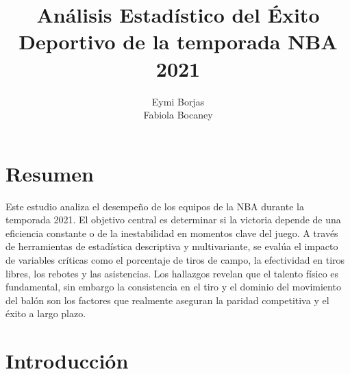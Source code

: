 \documentclass[oneside,11pt]{Latex/Classes/PhDthesisPSnPDF}
\title{Análisis Estadístico del Éxito Deportivo de la temporada NBA
2021}
\author{Eymi Borjas \\ Fabiola Bocaney}
\begin{document}
\maketitle

\frontmatter


\setcounter{secnumdepth}{3}
\setcounter{tocdepth}{3}

\tableofcontents



\cleardoublepage

  \cleardoublepage       %
  \chapter*{Resumen}     %
  
  Este estudio analiza el desempeño de los equipos de la NBA durante la
temporada 2021. El objetivo central es determinar si la victoria depende
de una eficiencia constante o de la inestabilidad en momentos clave del
juego. A través de herramientas de estadística descriptiva y
multivariante, se evalúa el impacto de variables críticas como el
porcentaje de tiros de campo, la efectividad en tiros libres, los
rebotes y las asistencias. Los hallazgos revelan que el talento físico
es fundamental, sin embargo la consistencia en el tiro y el dominio del
movimiento del balón son los factores que realmente aseguran la paridad
competitiva y el éxito a largo
plazo.             %
  
  \cleardoublepage

\mainmatter
\def\baselinestretch{1.5}

\chapter*{Introducción}
\end{document}
